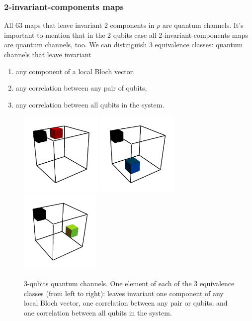 \documentclass[11pt,dvipsnames]{article} %
\newcommand{\1}{\mathds{1}}
\begin{document}
\subsubsection*{2-invariant-components maps}%
All 63 maps that leave invariant 2 components in $\rho$ are 
quantum channels. It's important to mention that in the 2 qubits case all 
2-invariant-components maps are quantum channels, too. We can distinguish
3 equivalence classes: quantum channels that leave invariant
\begin{enumerate}
	\item any component of a local Bloch vector,
	\item any correlation between any pair of qubits,
	\item any correlation between all qubits in the system.
\end{enumerate}
\begin{figure}[H]
	\centering
	\hfill \hfill
	\includegraphics[height=4cm]{img/3q-2c-1}
	\hfill
	\includegraphics[height=4cm]{img/3q-2c-2}
	\hfill
	\includegraphics[height=4cm]{img/3q-2c-3}
	\hfill \hfill
	\caption{3-qubits quantum channels. One element of each of the 
	3 equivalence classes 
	(from left to right): leaves invariant one component of any local
	Bloch vector, one correlation between any pair or qubits, and 
	one correlation between all qubits in the system.}
	\label{fig:QC-3q-2c}
\end{figure}
\end{document}
